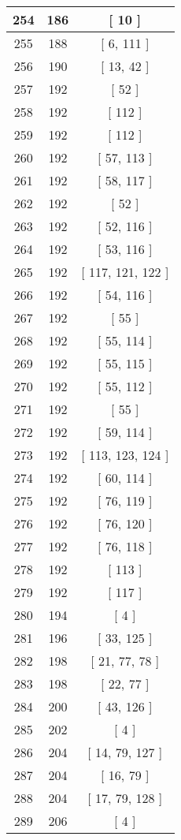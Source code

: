 \begin{center}
\begin{longtable}[H]{|| c c c ||}
\hline
254 & 186 & [ 10 ] \\ 
\hline
255 & 188 & [ 6, 111 ] \\ 
\hline
256 & 190 & [ 13, 42 ] \\ 
\hline
257 & 192 & [ 52 ] \\ 
\hline
258 & 192 & [ 112 ] \\ 
\hline
259 & 192 & [ 112 ] \\ 
\hline
260 & 192 & [ 57, 113 ] \\ 
\hline
261 & 192 & [ 58, 117 ] \\ 
\hline
262 & 192 & [ 52 ] \\ 
\hline
263 & 192 & [ 52, 116 ] \\ 
\hline
264 & 192 & [ 53, 116 ] \\ 
\hline
265 & 192 & [ 117, 121, 122 ] \\ 
\hline
266 & 192 & [ 54, 116 ] \\ 
\hline
267 & 192 & [ 55 ] \\ 
\hline
268 & 192 & [ 55, 114 ] \\ 
\hline
269 & 192 & [ 55, 115 ] \\ 
\hline
270 & 192 & [ 55, 112 ] \\ 
\hline
271 & 192 & [ 55 ] \\ 
\hline
272 & 192 & [ 59, 114 ] \\ 
\hline
273 & 192 & [ 113, 123, 124 ] \\ 
\hline
274 & 192 & [ 60, 114 ] \\ 
\hline
275 & 192 & [ 76, 119 ] \\ 
\hline
276 & 192 & [ 76, 120 ] \\ 
\hline
277 & 192 & [ 76, 118 ] \\ 
\hline
278 & 192 & [ 113 ] \\ 
\hline
279 & 192 & [ 117 ] \\ 
\hline
280 & 194 & [ 4 ] \\ 
\hline
281 & 196 & [ 33, 125 ] \\ 
\hline
282 & 198 & [ 21, 77, 78 ] \\ 
\hline
283 & 198 & [ 22, 77 ] \\ 
\hline
284 & 200 & [ 43, 126 ] \\ 
\hline
285 & 202 & [ 4 ] \\ 
\hline
286 & 204 & [ 14, 79, 127 ] \\ 
\hline
287 & 204 & [ 16, 79 ] \\ 
\hline
288 & 204 & [ 17, 79, 128 ] \\ 
\hline
289 & 206 & [ 4 ] \\ 

\end{longtable}
\end{center}
